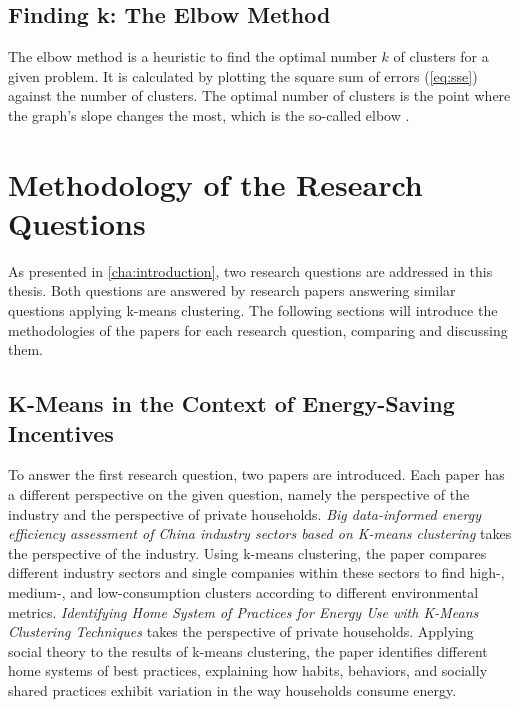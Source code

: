 \subsection{Finding k: The Elbow Method}
The elbow method is a heuristic to find the optimal number $k$ of clusters for a given problem.
It is calculated by plotting the square sum of errors (\autoref{eq:sse}) against the number of clusters.
The optimal number of clusters is the point where the graph's slope changes the most, which is the so-called elbow \cite{SYA-IKC}.

\section{Methodology of the Research Questions}
As presented in \autoref{cha:introduction}, two research questions are addressed in this thesis.
Both questions are answered by research papers answering similar questions applying k-means clustering.
The following sections will introduce the methodologies of the papers for each research question, comparing and discussing them.

\subsection{K-Means in the Context of Energy-Saving Incentives}
\label{subsec:k_means_in_the_context_of_energy_saving_incentives}
To answer the first research question, two papers are introduced.
Each paper has a different perspective on the given question, namely the perspective of the industry and the perspective of private households.
\textit{Big data-informed energy efficiency assessment of China industry sectors based on K-means clustering} \cite{LIU-BDE} takes the perspective of the industry.
Using k-means clustering, the paper compares different industry sectors and single companies within these sectors to find high-, medium-, and low-consumption clusters according to different environmental metrics.
\textit{Identifying Home System of Practices for Energy Use with K-Means Clustering Techniques} \cite{MAL-HBP} takes the perspective of private households.
Applying social theory to the results of k-means clustering, the paper identifies different home systems of best practices, explaining how habits, behaviors, and socially shared practices exhibit variation in the way households consume energy.

